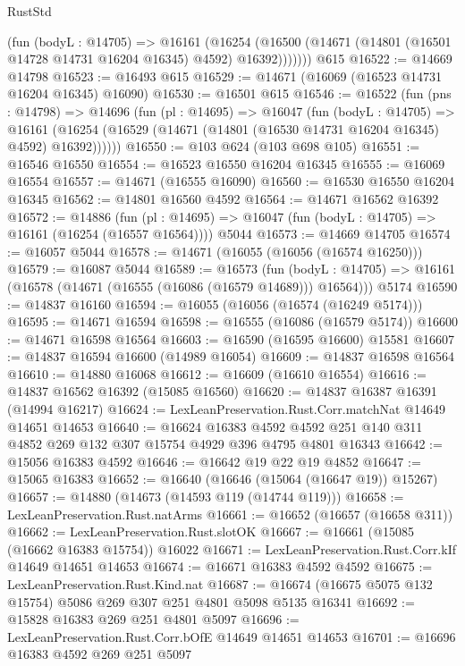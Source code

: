 \begin{lexlean}{RustStd}
\begin{coremodule}
          (fun (bodyL : @14705) =>
          @16161
            (@16254
              (@16500 (@14671 (@14801 (@16501 @14728 @14731 @16204 @16345) @4592) @16392)))))))
    @615
@16522 := @14669 @14798
@16523 := @16493 @615
@16529 := @14671 (@16069 (@16523 @14731 @16204 @16345) @16090)
@16530 := @16501 @615
@16546 := @16522
    (fun (pns : @14798) =>
    @14696
      (fun (pl : @14695) =>
      @16047
        (fun (bodyL : @14705) =>
        @16161 (@16254 (@16529 (@14671 (@14801 (@16530 @14731 @16204 @16345) @4592) @16392))))))
@16550 := @103 @624 (@103 @698 @105)
@16551 := @16546 @16550
@16554 := @16523 @16550 @16204 @16345
@16555 := @16069 @16554
@16557 := @14671 (@16555 @16090)
@16560 := @16530 @16550 @16204 @16345
@16562 := @14801 @16560 @4592
@16564 := @14671 @16562 @16392
@16572 := @14886
    (fun (pl : @14695) => @16047 (fun (bodyL : @14705) => @16161 (@16254 (@16557 @16564))))
    @5044
@16573 := @14669 @14705
@16574 := @16057 @5044
@16578 := @14671 (@16055 (@16056 (@16574 @16250)))
@16579 := @16087 @5044
@16589 := @16573
    (fun (bodyL : @14705) => @16161 (@16578 (@14671 (@16555 (@16086 (@16579 @14689))) @16564)))
    @5174
@16590 := @14837 @16160
@16594 := @16055 (@16056 (@16574 (@16249 @5174)))
@16595 := @14671 @16594
@16598 := @16555 (@16086 (@16579 @5174))
@16600 := @14671 @16598 @16564
@16603 := @16590 (@16595 @16600) @15581
@16607 := @14837 @16594 @16600 (@14989 @16054)
@16609 := @14837 @16598 @16564
@16610 := @14880 @16068
@16612 := @16609 (@16610 @16554)
@16616 := @14837 @16562 @16392 (@15085 @16560)
@16620 := @14837 @16387 @16391 (@14994 @16217)
@16624 := LexLeanPreservation.Rust.Corr.matchNat @14649 @14651 @14653
@16640 := @16624
    @16383
    @4592
    @4592
    @251
    @140
    @311
    @4852
    @269
    @132
    @307
    @15754
    @4929
    @396
    @4795
    @4801
    @16343
@16642 := @15056 @16383 @4592
@16646 := @16642 @19 @22 @19 @4852
@16647 := @15065 @16383
@16652 := @16640 (@16646 (@15064 (@16647 @19)) @15267)
@16657 := @14880 (@14673 (@14593 @119 (@14744 @119)))
@16658 := LexLeanPreservation.Rust.natArms
@16661 := @16652 (@16657 (@16658 @311))
@16662 := LexLeanPreservation.Rust.slotOK
@16667 := @16661 (@15085 (@16662 @16383 @15754)) @16022
@16671 := LexLeanPreservation.Rust.Corr.kIf @14649 @14651 @14653
@16674 := @16671 @16383 @4592 @4592
@16675 := LexLeanPreservation.Rust.Kind.nat
@16687 := @16674 (@16675 @5075 @132 @15754) @5086 @269 @307 @251 @4801 @5098 @5135 @16341
@16692 := @15828 @16383 @269 @251 @4801 @5097
@16696 := LexLeanPreservation.Rust.Corr.bOfE @14649 @14651 @14653
@16701 := @16696 @16383 @4592 @269 @251 @5097

\end{coremodule}
\end{lexlean}
